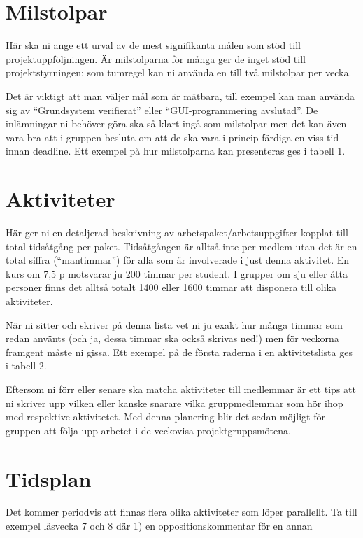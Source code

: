 \documentclass{article}
\begin{document}
\section{Milstolpar}
Här ska ni ange ett urval av de mest signifikanta målen som stöd till projektuppföljningen. Är milstolparna för många ger de inget stöd till projektstyrningen;
som tumregel kan ni använda en till två milstolpar per vecka.\par
Det är viktigt att man väljer mål som är mätbara, till exempel kan man
använda sig av “Grundsystem verifierat” eller “GUI-programmering avslutad”.
De inlämningar ni behöver göra ska så klart ingå som milstolpar men det kan
även vara bra att i gruppen besluta om att de ska vara i princip färdiga en
viss tid innan deadline. Ett exempel på hur milstolparna kan presenteras ges i
tabell 1.

\section{Aktiviteter}
Här ger ni en detaljerad beskrivning av arbetspaket/arbetsuppgifter kopplat till
total tidsåtgång per paket. Tidsåtgången är alltså inte per medlem utan det är
en total siffra (“mantimmar”) för alla som är involverade i just denna aktivitet.
En kurs om 7,5 p motsvarar ju 200 timmar per student. I grupper om sju eller
åtta personer finns det alltså totalt 1400 eller 1600 timmar att disponera till
olika aktiviteter.\par
När ni sitter och skriver på denna lista vet ni ju exakt hur många timmar som
redan använts (och ja, dessa timmar ska också skrivas ned!) men för veckorna
framgent måste ni gissa. Ett exempel på de första raderna i en aktivitetslista
ges i tabell 2.\par
Eftersom ni förr eller senare ska matcha aktiviteter till medlemmar är ett
tips att ni skriver upp vilken eller kanske snarare vilka gruppmedlemmar som
hör ihop med respektive aktivitetet. Med denna planering blir det sedan möjligt
för gruppen att följa upp arbetet i de veckovisa projektgruppsmötena.

\section{Tidsplan}
Det kommer periodvis att finnas flera olika aktiviteter som löper parallellt. Ta
till exempel läsvecka 7 och 8 där 1) en oppositionskommentar för en annan
\end{document}
